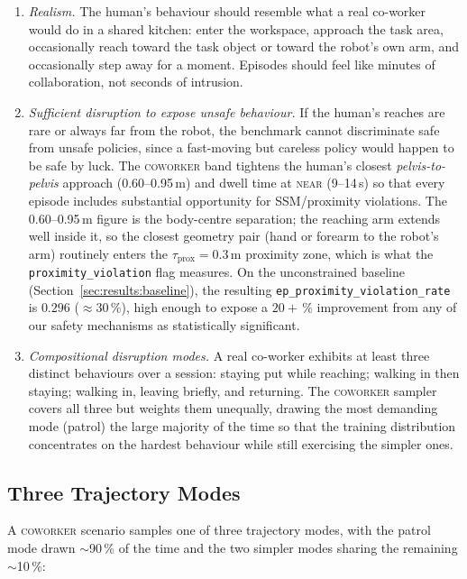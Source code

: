 \documentclass[11pt,a4paper]{report}
\newcommand{\ssm}{SSM}
\newcommand{\coworker}{\textsc{coworker}}
\begin{document}
\begin{enumerate}[topsep=2pt,itemsep=2pt]
\item \emph{Realism.} The human's behaviour should resemble what a
  real co-worker would do in a shared kitchen: enter the workspace,
  approach the task area, occasionally reach toward the task object
  or toward the robot's own arm, and occasionally step
  away for a moment. Episodes should feel like minutes of
  collaboration, not seconds of intrusion.
\item \emph{Sufficient disruption to expose unsafe behaviour.} If
  the human's reaches are rare or always far from the robot, the
  benchmark cannot discriminate safe from unsafe policies, since a
  fast-moving but careless policy would happen to be safe by luck.
  The \coworker{} band tightens the human's closest \emph{pelvis-to-pelvis}
  approach (0.60--0.95\,m) and dwell time at \textsc{near} (9--14\,s)
  so that every episode includes substantial opportunity for
  \ssm{}/proximity violations. The 0.60--0.95\,m figure is the
  body-centre separation; the reaching arm extends well inside it, so
  the closest geometry pair (hand or forearm to the robot's arm) routinely
  enters the $\tau_{\mathrm{prox}} = 0.3$\,m proximity zone, which is
  what the \texttt{proximity\_violation} flag measures. On the
  unconstrained baseline (Section~\ref{sec:results:baseline}), the
  resulting \texttt{ep\_proximity\_violation\_rate} is $0.296$ ($\approx$30\,\%),
  high enough to expose a $20+\,\%$ improvement from any of our
  safety mechanisms as statistically significant.
\item \emph{Compositional disruption modes.} A real co-worker
  exhibits at least three distinct behaviours over a session:
  staying put while reaching; walking in then staying; walking in,
  leaving briefly, and returning. The \coworker{} sampler covers all
  three but weights them unequally, drawing the most demanding mode
  (patrol) the large majority of the time so that the training
  distribution concentrates on the hardest behaviour while still
  exercising the simpler ones.
\end{enumerate}

\subsection{Three Trajectory Modes}
\label{sec:bench:coworker:traj}

A \coworker{} scenario samples one of three trajectory modes, with
the patrol mode drawn $\sim$90\,\% of the time and the two simpler
modes sharing the remaining $\sim$10\,\%:
\end{document}
